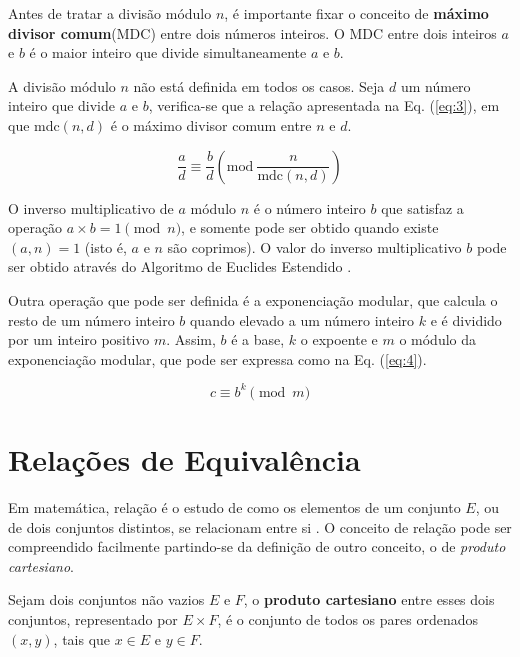 Antes de tratar a divisão módulo \(n\), é importante fixar o conceito de \textbf{máximo divisor comum}(MDC) entre dois números inteiros. O MDC entre dois inteiros \(a\) e \(b\) 
é o maior inteiro que divide simultaneamente \(a\) e \(b\).

A divisão módulo $n$ não está definida em todos os casos. Seja \(d\) um número inteiro que divide \(a\) e \(b\), verifica-se que a relação apresentada na Eq. (\ref{eq:3}), em que mdc\((n, d)\) é o máximo divisor comum entre \(n\) e \(d\).

\begin{equation}
  \frac{a}{d} \equiv \frac{b}{d}\left(\mbox{mod}\ \frac{n}{\text{mdc}(n,d)}\right) \label{eq:3}
\end{equation}

O inverso multiplicativo de $a$ módulo \(n\) é o número inteiro \(b\) que satisfaz a operação \(a \times b = 1 \pmod  n\), e somente pode ser obtido quando existe \((a, n) = 1\) (isto é, \(a\) e \(n\) são coprimos). O valor do inverso multiplicativo \(b\) pode ser obtido através do Algoritmo de Euclides Estendido \cite{Halim:2013}.

\par Outra operação que pode ser definida é a exponenciação modular, que calcula o resto de um número inteiro \(b\) quando elevado a um número inteiro \(k\) e é dividido por um inteiro positivo \(m\). Assim, $b$ é a base, $k$ o expoente e $m$ o módulo da exponenciação modular, que pode ser expressa como na Eq. (\ref{eq:4}).

\begin{equation}
  c \equiv b^k\pmod m \label{eq:4}
\end{equation}


%
%
\section{Relações de Equivalência}
\label{relacoes_equivalencia}

Em matemática, relação é o estudo de como os elementos de um conjunto $E$, ou de dois conjuntos distintos, se relacionam entre si \cite{Domingues:2003}. O conceito de relação pode ser compreendido facilmente partindo-se da definição de outro conceito, o de \textit{produto cartesiano}.

Sejam dois conjuntos não vazios \(E\) e \(F\), o \textbf{produto cartesiano} entre esses dois conjuntos, representado por \(E \times F\), é o conjunto de todos os pares ordenados \((x, y)\), tais que \(x \in E\) e \(y \in F\).

